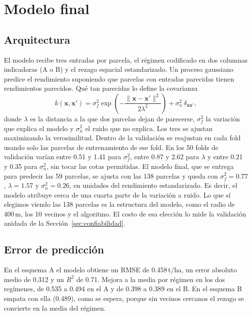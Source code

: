 \section{Modelo final}\label{sec:final}

\subsection{Arquitectura}
El modelo recibe tres entradas por parcela, el régimen codificado en dos columnas indicadoras (A o B) y el rezago
espacial estandarizado. Un proceso gaussiano~\cite{rasmussen2006} predice el rendimiento suponiendo que parcelas con
entradas parecidas tienen rendimientos parecidos. Qué tan parecidas lo define la covarianza
\begin{equation}
k(\mathbf{x},\mathbf{x}') = \sigma_f^2 \exp\!\left(-\frac{\lVert\mathbf{x}-\mathbf{x}'\rVert^2}{2\lambda^2}\right) +
\sigma_n^2\,\delta_{\mathbf{x}\mathbf{x}'} ,
\label{eq:kernel}
\end{equation}
donde $\lambda$ es la distancia a la que dos parcelas dejan de parecerse, $\sigma_f^2$ la variación que explica el
modelo y $\sigma_n^2$ el ruido que no explica. Los tres se ajustan maximizando la verosimilitud. Dentro de
la validación se reajustan en cada fold usando solo las parcelas de entrenamiento de ese fold. En los 50 folds de
validación varían entre 0.51 y 1.41 para $\sigma_f^2$, entre 0.87 y 2.62 para $\lambda$ y entre 0.21 y 0.35 para
$\sigma_n^2$, sin tocar las cotas permitidas. El modelo final, que se entrega para predecir las 59 parcelas, se ajusta
con las 138 parcelas y queda con $\sigma_f^2=0.77$, $\lambda=1.57$ y $\sigma_n^2=0.26$, en unidades del rendimiento
estandarizado. Es decir, el modelo atribuye cerca de una cuarta parte de la variación a ruido. Lo que sí elegimos
viendo las 138 parcelas es la estructura del modelo, como el radio de 400\,m, los 10 vecinos y el algoritmo. El costo de
esa elección lo mide la validación anidada de la Sección~\ref{sec:confiabilidad}.

\subsection{Error de predicción}
En el esquema A el modelo obtiene un RMSE de 0.458\,t/ha, un error absoluto medio de 0.312 y un $R^2$ de 0.71. Mejora a
la media por régimen en los dos regímenes, de 0.535 a 0.494 en el A y de 0.398 a 0.389 en el B. En el esquema B empata
con ella (0.489), como se espera, porque sin vecinos cercanos el rezago se convierte en la media del régimen.

